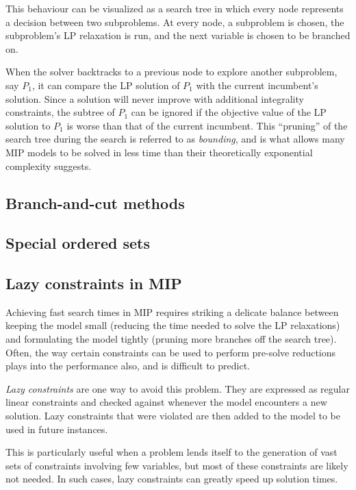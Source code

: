 \documentclass[13pt, letterpaper, oneside]{book}
\begin{document}
This behaviour can be visualized as a search tree in which every node represents
a decision between two subproblems. At every node, a subproblem is chosen, the
subproblem's LP relaxation is run, and the next variable is chosen to be
branched on.

When the solver backtracks to a previous node to explore another subproblem, say
$P_1$, it can compare the LP solution of $P_1$ with the current incumbent's
solution. Since a solution will never improve with additional integrality
constraints, the subtree of $P_1$ can be ignored if the objective value of the
LP solution to $P_1$ is worse than that of the current incumbent. This
``pruning'' of the search tree during the search is referred to as
\textit{bounding}, and is what allows many MIP models to be solved in less time than
their theoretically exponential complexity suggests.

\subsection{Branch-and-cut methods}

\subsection{Special ordered sets}

\subsection{Lazy constraints in MIP}\label{sec:lazyconstraints}
Achieving fast search times in MIP requires striking a delicate balance between
keeping the model small (reducing the time needed to solve the LP relaxations)
and formulating the model tightly (pruning more branches off the search tree).
Often, the way certain constraints can be used to perform pre-solve reductions
plays into the performance also, and is difficult to predict.

\textit{Lazy constraints} are one way to avoid this problem. They are expressed
as regular linear constraints and checked against whenever the model encounters
a new solution. Lazy constraints that were violated are then added to the model
to be used in future instances.

This is particularly useful when a problem lends itself to the generation of
vast sets of constraints involving few variables, but most of these constraints
are likely not needed. In such cases, lazy constraints can greatly speed up
solution times.
\end{document}
